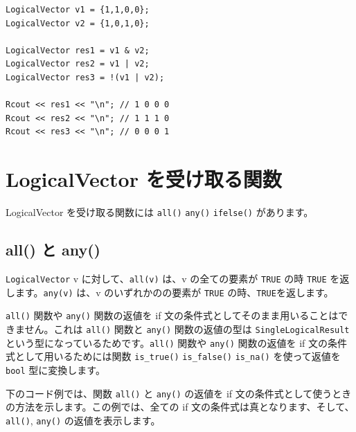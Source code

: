 \documentclass[]{book}
\begin{document}
\begin{verbatim}
LogicalVector v1 = {1,1,0,0};
LogicalVector v2 = {1,0,1,0};

LogicalVector res1 = v1 & v2;
LogicalVector res2 = v1 | v2;
LogicalVector res3 = !(v1 | v2);

Rcout << res1 << "\n"; // 1 0 0 0
Rcout << res2 << "\n"; // 1 1 1 0
Rcout << res3 << "\n"; // 0 0 0 1
\end{verbatim}

\hypertarget{logicalvector-}{%
\section{LogicalVector を受け取る関数}\label{logicalvector-}}

LogicalVector を受け取る関数には \texttt{all()} \texttt{any()} \texttt{ifelse()} があります。

\hypertarget{all--any}{%
\subsection{all() と any()}\label{all--any}}

\texttt{LogicalVector} v に対して、\texttt{all(v)} は、v の全ての要素が \texttt{TRUE} の時 \texttt{TRUE} を返します。\texttt{any(v)} は、v のいずれかのの要素が \texttt{TRUE} の時、\texttt{TRUE}を返します。

\texttt{all()} 関数や \texttt{any()} 関数の返値を if 文の条件式としてそのまま用いることはできません。これは \texttt{all()} 関数と \texttt{any()} 関数の返値の型は \texttt{SingleLogicalResult} という型になっているためです。\texttt{all()} 関数や \texttt{any()} 関数の返値を if 文の条件式として用いるためには関数 \texttt{is\_true()} \texttt{is\_false()} \texttt{is\_na()} を使って返値を \texttt{bool} 型に変換します。

下のコード例では、関数 \texttt{all()} と \texttt{any()} の返値を if 文の条件式として使うときの方法を示します。この例では、全ての if 文の条件式は真となります、そして、\texttt{all()}, \texttt{any()} の返値を表示します。
\end{document}
